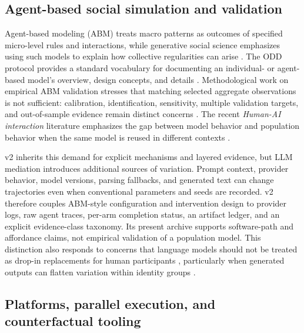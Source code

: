 \subsection{Agent-based social simulation and validation}

Agent-based modeling (ABM) treats macro patterns as outcomes of specified
micro-level rules and interactions, while generative social science
emphasizes using such models to explain how collective regularities can
arise \citep{epstein2006generative}.  The ODD protocol provides a standard
vocabulary for documenting an individual- or agent-based model's overview,
design concepts, and details \citep{grimm2006odd}.  Methodological work on
empirical ABM validation stresses that matching selected aggregate
observations is not sufficient: calibration, identification, sensitivity,
multiple validation targets, and out-of-sample evidence remain distinct
concerns \citep{windrum2007empirical,fagiolo2007critical}.  The recent
\emph{Human-AI interaction} literature emphasizes the gap between model
behavior and population behavior when the same model is reused in different
contexts \citep{kapania2025between}.

v2 inherits this demand for explicit mechanisms and layered evidence, but
LLM mediation introduces additional sources of variation.  Prompt context,
provider behavior, model versions, parsing fallbacks, and generated text
can change trajectories even when conventional parameters and seeds are
recorded.  v2 therefore couples ABM-style configuration and intervention
design to provider logs, raw agent traces, per-arm completion status, an
artifact ledger, and an explicit evidence-class taxonomy.  Its present
archive supports software-path and affordance claims, not empirical
validation of a population model.  This distinction also responds to
concerns that language models should not be treated as drop-in replacements
for human participants \citep{dillion2023replace}, particularly when
generated outputs can flatten variation within identity groups
\citep{wang2025flatten}.

\subsection{Platforms, parallel execution, and counterfactual tooling}

